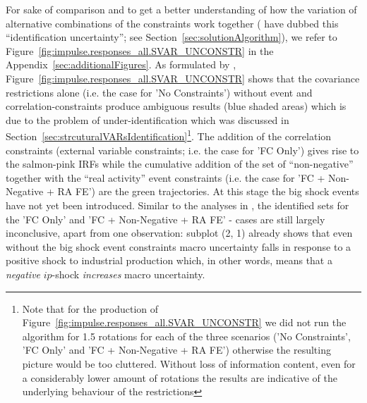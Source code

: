 \documentclass[a4paper,11pt,listof=nochaptergap,oneside,pointednumbers,bibtotoc,bigheadings,liststotoc,hidelinks]{scrbook}
\theoremstyle{mysatz}
\theoremstyle{mydefinition}
\theoremstyle{mytheorem}
\theoremstyle{mybemerkung}
\begin{document}
For sake of comparison and to get a better understanding of how the variation of alternative combinations of the constraints work together (\citet{ludvigsonetal:19} have dubbed this ``identification uncertainty''; see Section~\ref{sec:solutionAlgorithm}), we refer to Figure~\ref{fig:impulse.responses_all.SVAR_UNCONSTR} in the Appendix~\ref{sec:additionalFigures}. As formulated by \citet{ludvigsonetal:19}, Figure~\ref{fig:impulse.responses_all.SVAR_UNCONSTR} shows that the covariance restrictions alone (i.e. the case for 'No Constraints') without event and correlation-constraints produce ambiguous results (blue shaded areas) which is due to the problem of under-identification which was discussed in Section~\ref{sec:strcuturalVARsIdentification}\footnote{Note that for the production of Figure~\ref{fig:impulse.responses_all.SVAR_UNCONSTR} we did not run the algorithm for 1.5 rotations for each of the three scenarios ('No Constraints', 'FC Only' and 'FC + Non-Negative + RA FE') otherwise the resulting picture would be too cluttered. Without loss of information content, even for a considerably lower amount of rotations the results are indicative of the underlying behaviour of the restrictions}. The addition of the correlation constraints (external variable constraints; i.e. the case for 'FC Only') gives rise to the salmon-pink IRFs while the cumulative addition of the set of ``non-negative'' together with the ``real activity'' event constraints (i.e. the case for 'FC + Non-Negative + RA FE') are the green trajectories. At this stage the big shock events have not yet been introduced. Similar to the analyses in \citet{ludvigsonetal:19}, the identified sets for the 'FC Only' and 'FC + Non-Negative + RA FE' - cases are still largely inconclusive, apart from one observation: subplot (2, 1) already shows that even without the big shock event constraints macro uncertainty falls in response to a positive shock to industrial production which, in other words, means that a \textit{negative} $ip$-shock \textit{increases} macro uncertainty. 
\end{document}
